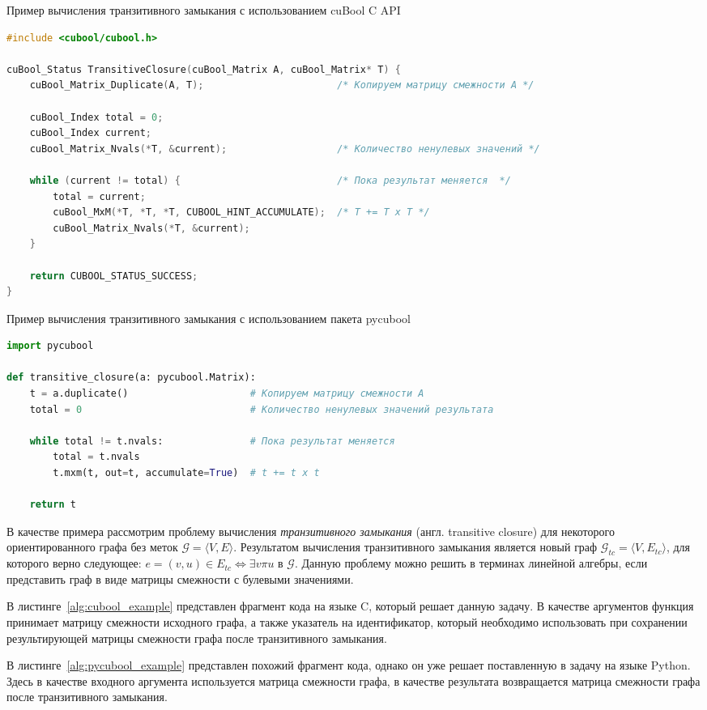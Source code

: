 \begin{algorithm}[]
\caption{Пример вычисления транзитивного замыкания с использованием cuBool C API}
\label{alg:cubool_example}
\begin{lstlisting}[language=C++]
#include <cubool/cubool.h>

cuBool_Status TransitiveClosure(cuBool_Matrix A, cuBool_Matrix* T) {
    cuBool_Matrix_Duplicate(A, T);                       /* Копируем матрицу смежности А */

    cuBool_Index total = 0;
    cuBool_Index current;
    cuBool_Matrix_Nvals(*T, &current);                   /* Количество ненулевых значений */

    while (current != total) {                           /* Пока результат меняется  */
        total = current;
        cuBool_MxM(*T, *T, *T, CUBOOL_HINT_ACCUMULATE);  /* T += T x T */
        cuBool_Matrix_Nvals(*T, &current);
    }

    return CUBOOL_STATUS_SUCCESS;
}
\end{lstlisting}
\end{algorithm}

\begin{algorithm}[]
\caption{Пример вычисления транзитивного замыкания с использованием пакета pycubool}
\label{alg:pycubool_example}
\begin{lstlisting}[language=Python]
import pycubool

def transitive_closure(a: pycubool.Matrix):
    t = a.duplicate()                     # Копируем матрицу смежности А
    total = 0                             # Количество ненулевых значений результата

    while total != t.nvals:               # Пока результат меняется
        total = t.nvals
        t.mxm(t, out=t, accumulate=True)  # t += t x t

    return t
\end{lstlisting}
\end{algorithm}

В качестве примера рассмотрим проблему вычисления \textit{транзитивного замыкания} (англ. transitive closure) для некоторого ориентированного графа без меток $\mathcal{G} = \langle V, E \rangle$. Результатом вычисления транзитивного замыкания является новый граф $\mathcal{G}_{tc} = \langle V, E_{tc} \rangle$, для которого верно следующее: $e = (v,u) \in E_{tc} \iff \exists v \pi u $ в $\mathcal{G}$. Данную проблему можно решить в терминах линейной алгебры, если представить граф в виде матрицы смежности с булевыми значениями. 

В листинге~\ref{alg:cubool_example} представлен фрагмент кода на языке C, который решает данную задачу. В качестве аргументов функция принимает матрицу смежности исходного графа, а также указатель на идентификатор, который необходимо использовать при сохранении результирующей матрицы смежности графа после транзитивного замыкания.

В листинге~\ref{alg:pycubool_example} представлен похожий фрагмент кода, однако он уже решает поставленную в задачу на языке Python. Здесь в качестве входного аргумента используется матрица смежности графа, в качестве результата возвращается матрица смежности графа после транзитивного замыкания.
